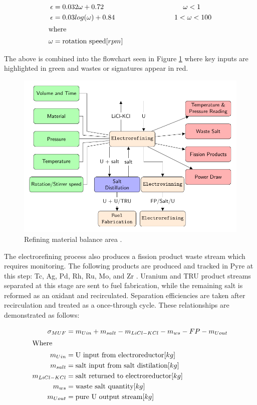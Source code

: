 \begin{align}
\epsilon &= 0.032 \omega + 0.72		\mbox{\hspace{40mm}}	\omega < 1 \\
\epsilon &= 0.03 log(\omega) + 0.84		\mbox{\hspace{30mm}}	1 < \omega < 100 \\
\intertext{where}
\omega &= \mbox{rotation speed} [rpm] \nonumber
\end{align}

The above is combined into the flowchart seen in Figure \ref{fig:refining} where key inputs are highlighted in green and wastes or signatures appear in red. 

\begin{figure}[h]
	\centering
	\includegraphics[width=0.85\linewidth]{images/refining}
	\caption{Refining material balance area \cite{lee_advanced_2008}.}
	\label{fig:refining}
\end{figure}

The electrorefining process also produces a fission product waste stream which requires monitoring. 
The following products are produced and tracked in Pyre at this step: Tc, Ag, Pd, Rh, Ru, Mo, and Zr \cite{flowsheet_1998}. 
Uranium and \gls{TRU} product streams separated at this stage are sent to fuel fabrication, while the remaining salt is reformed as an oxidant and recirculated.
Separation efficiencies are taken after recirculation and treated as a once-through cycle. These relationships are demonstrated as follows:

\begin{align}
\sigma_{MUF} &= m_{U in} + m_{salt} - m_{LiCl-KCl} - m_{ws} - FP - m_{U out} \\
\intertext{Where}
m_{U in} &= \mbox{U input from electroreductor} [kg] \nonumber \\
m_{salt} &= \mbox{salt input from salt distilation} [kg] \nonumber \\
m_{LiCl-KCl} &= \mbox{salt returned to electroreductor} [kg] \nonumber \\
m_{ws} &= \mbox{waste salt quantity} [kg] \nonumber \\
m_{U out} &= \mbox{pure U output stream} [kg] \nonumber
\end{align}

